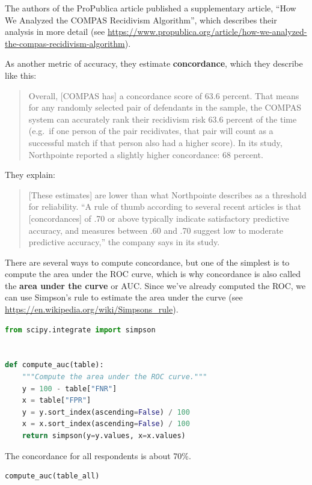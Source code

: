 The authors of the ProPublica article published a supplementary article,
``How We Analyzed the COMPAS Recidivism Algorithm'', which describes
their analysis in more detail (see
\url{https://www.propublica.org/article/how-we-analyzed-the-compas-recidivism-algorithm}).

As another metric of accuracy, they estimate \textbf{concordance}, which
they describe like this:

\begin{quote}
Overall, {[}COMPAS has{]} a concordance score of 63.6 percent. That
means for any randomly selected pair of defendants in the sample, the
COMPAS system can accurately rank their recidivism risk 63.6 percent of
the time (e.g.~if one person of the pair recidivates, that pair will
count as a successful match if that person also had a higher score). In
its study, Northpointe reported a slightly higher concordance: 68
percent.
\end{quote}

They explain:

\begin{quote}
{[}These estimates{]} are lower than what Northpointe describes as a
threshold for reliability. ``A rule of thumb according to several recent
articles is that {[}concordances{]} of .70 or above typically indicate
satisfactory predictive accuracy, and measures between .60 and .70
suggest low to moderate predictive accuracy,'' the company says in its
study.
\end{quote}

There are several ways to compute concordance, but one of the simplest
is to compute the area under the ROC curve, which is why concordance is
also called the \textbf{area under the curve} or AUC. Since we've
already computed the ROC, we can use Simpson's rule to estimate the area
under the curve (see \url{https://en.wikipedia.org/wiki/Simpsons_rule}).

\begin{lstlisting}[language=Python,style=source]
from scipy.integrate import simpson


def compute_auc(table):
    """Compute the area under the ROC curve."""
    y = 100 - table["FNR"]
    x = table["FPR"]
    y = y.sort_index(ascending=False) / 100
    x = x.sort_index(ascending=False) / 100
    return simpson(y=y.values, x=x.values)
\end{lstlisting}

The concordance for all respondents is about 70\%.

\begin{lstlisting}[language=Python,style=source]
compute_auc(table_all)
\end{lstlisting}

